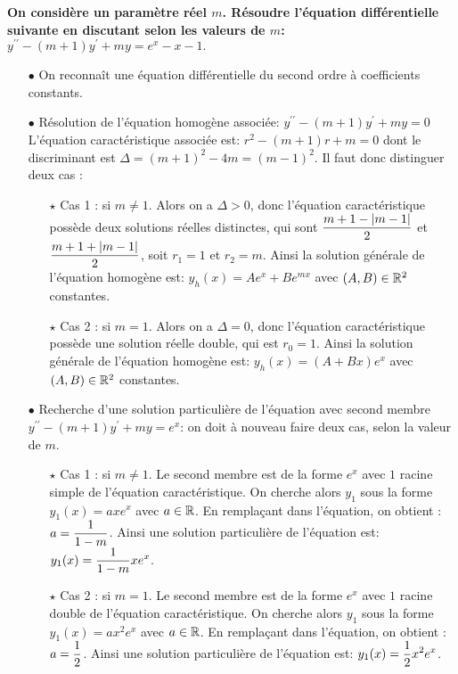 \documentclass[a4paper, 11pt,reqno]{article}
\begin{document}
\begin{correction}  \;
  \textbf{On consid\`ere un param\`etre r\'eel $m$. R\'esoudre l'\'equation diff\'erentielle suivante en discutant selon les valeurs de $m$: $y^{\prime\prime}-(m+1)y^{\prime}+my=e^x-x-1.$}\\
  \begin{itemize}
    \item[$\bullet$] On reconna\^{i}t une \'equation diff\'erentielle du second ordre \`{a} coefficients constants.
    \item[$\bullet$] R\'esolution de l'\'equation homog\`{e}ne associ\'ee: $y^{\prime\prime}-(m+1)y^{\prime}+my=0$\\
          \noindent L'\'equation caract\'eristique associ\'ee est: $r^2-(m+1)r+m=0$ dont le discriminant est $\Delta=(m+1)^2-4m=(m-1)^2$. Il faut donc distinguer deux cas :
          \begin{itemize}
            \item[$\star$] Cas 1 : si $m\not=1$. Alors on a $\Delta > 0$, donc l'\'equation caract\'eristique poss\`ede deux solutions r\'eelles distinctes, qui sont $\displaystyle \frac{m+1-|m-1|}{2}$ et $\displaystyle \frac{m+1+|m-1|}{2}$, soit $r_1=1$ et $r_2=m$. Ainsi la solution g\'en\'erale de l'\'equation homog\`{e}ne est: $y_h(x) = Ae^x + Be^{mx}$ avec $(A,B)\in\mathbb{R}^2$ constantes.
            \item[$\star$] Cas 2 : si $m=1$. Alors on a $\Delta = 0$, donc l'\'equation caract\'eristique poss\`ede une solution r\'eelle double, qui est $r_0=1$. Ainsi la solution g\'en\'erale de l'\'equation homog\`{e}ne est: $y_h(x) = (A+Bx)e^x$ avec $(A,B)\in\mathbb{R}^2$ constantes.
          \end{itemize}
    \item[$\bullet$] Recherche d'une solution particuli\`{e}re de l'\'equation avec second membre $y^{\prime\prime}-(m+1)y^{\prime}+my=e^x$: on doit \`a nouveau faire deux cas, selon la valeur de $m$.
          \begin{itemize}
            \item[$\star$] Cas 1 : si $m\not=1$. Le second membre est de la forme $e^{x}$ avec $1$ racine simple de l'\'equation caract\'eristique. On cherche alors $y_1$ sous la forme $y_1(x)=a x e^{x}$ avec $a \in \mathbb{R}$. En rempla\c cant dans l'\'equation, on obtient : $a=\displaystyle\frac{1}{1-m}$. Ainsi une solution particuli\`{e}re de l'\'equation est: $\displaystyle y_1(x)= \frac{1}{1-m} x e^x$.
            \item[$\star$] Cas 2 : si $m=1$. Le second membre est de la forme $e^{x}$ avec $1$ racine double de l'\'equation caract\'eristique. On cherche alors $y_1$ sous la forme $y_1(x)=a x^2 e^{x}$ avec $a \in \mathbb{R}$. En rempla\c cant dans l'\'equation, on obtient : $a=\displaystyle\frac{1}{2}$. Ainsi une solution particuli\`{e}re de l'\'equation est: $y_1(x)= \displaystyle \frac{1}{2} x^2 e^x$.

\end{itemize}
\end{itemize}
\end{correction}
\end{document}
